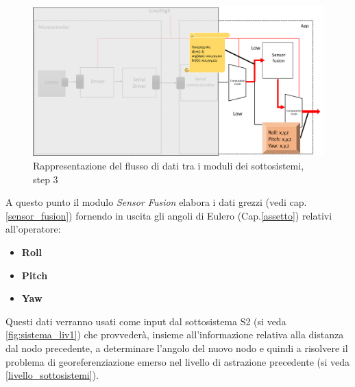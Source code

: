  \begin{figure}[H]  
 	\centering 
 	\includegraphics[scale=0.25 ]{DescrizioneDelSistema/flusso3.png}
 	\caption{Rappresentazione del flusso di dati tra i moduli dei sottosistemi, step 3}
 	\label{fig:flusso3}
 \end{figure}
\newpage
A questo punto il modulo \textit{Sensor Fusion} elabora i dati grezzi (vedi cap.\ref{sensor_fusion}) fornendo in uscita gli angoli di Eulero (Cap.\ref{assetto}) relativi all'operatore:
\begin{itemize}
	\item \textbf{Roll}
	\item \textbf{Pitch}
	\item \textbf{Yaw} 
\end{itemize}
Questi dati verranno usati come input dal sottosistema S2 (si veda \ref{fig:sistema_liv1}) che provvederà, insieme all'informazione relativa alla distanza dal nodo precedente, a determinare l'angolo del nuovo nodo e quindi a risolvere il problema di georeferenziazione emerso nel livello di astrazione precedente (si veda \ref{livello_sottosistemi}).
